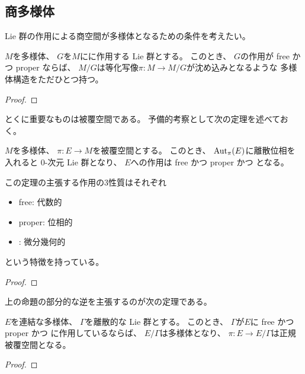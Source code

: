 \documentclass[report]{jlreq}
\begin{document}
\subsection{商多様体}

Lie 群の作用による商空間が多様体となるための条件を考えたい。

\begin{theorem}[商多様体定理]
    $M$を多様体、
    $G$を$M$に{\smooth}に作用する Lie 群とする。
    このとき、
    $G$の作用が free かつ proper ならば、
    $M / G$は等化写像$\pi \colon M \to M / G$が沈め込みとなるような
    多様体構造をただひとつ持つ。
\end{theorem}

\begin{proof}
    \TODO{}
\end{proof}

とくに重要なものは被覆空間である。
予備的考察として次の定理を述べておく。

\begin{theorem}[被覆変換群の作用]
    $M$を多様体、
    $\pi \colon E \to M$を被覆空間とする。
    このとき、
    $\operatorname{Aut}_\pi(E)$に離散位相を入れると
    $0$-次元 Lie 群となり、
    $E$への作用は free かつ proper かつ \smooth となる。
\end{theorem}

この定理の主張する作用の3性質はそれぞれ
\begin{itemize}
    \item free: 代数的
    \item proper: 位相的
    \item \smooth: 微分幾何的
\end{itemize}
という特徴を持っている。

\begin{proof}
    \TODO{}
\end{proof}

上の命題の部分的な逆を主張するのが次の定理である。

\begin{theorem}
    $E$を連結な多様体、
    $\Gamma$を離散的な Lie 群とする。
    このとき、
    $\Gamma$が$E$に free かつ proper かつ \smooth に作用しているならば、
    $E / \Gamma$は多様体となり、
    $\pi \colon E \to E / \Gamma$は正規被覆空間となる。
\end{theorem}

\begin{proof}
    \TODO{}
\end{proof}

%
\end{document}
